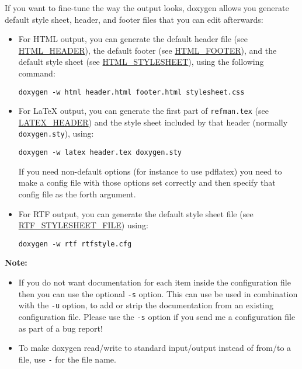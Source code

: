If you want to fine-tune the way the output looks, doxygen allows you generate default style sheet, header, and footer files that you can edit afterwards: \begin{itemize}
\item For HTML output, you can generate the default header file (see \hyperlink{config_cfg_html_header}{HTML\_\-HEADER}), the default footer (see \hyperlink{config_cfg_html_footer}{HTML\_\-FOOTER}), and the default style sheet (see \hyperlink{config_cfg_html_stylesheet}{HTML\_\-STYLESHEET}), using the following command: 

\footnotesize\begin{verbatim}
doxygen -w html header.html footer.html stylesheet.css
\end{verbatim}
\normalsize
 \item For LaTeX output, you can generate the first part of {\tt refman.tex} (see \hyperlink{config_cfg_latex_header}{LATEX\_\-HEADER}) and the style sheet included by that header (normally {\tt doxygen.sty}), using: 

\footnotesize\begin{verbatim}
doxygen -w latex header.tex doxygen.sty
\end{verbatim}
\normalsize
 If you need non-default options (for instance to use pdflatex) you need to make a config file with those options set correctly and then specify that config file as the forth argument. \item For RTF output, you can generate the default style sheet file (see \hyperlink{config_cfg_rtf_stylesheet_file}{RTF\_\-STYLESHEET\_\-FILE}) using: 

\footnotesize\begin{verbatim}
doxygen -w rtf rtfstyle.cfg
\end{verbatim}
\normalsize
 \end{itemize}


{\bf Note:}\par
 \begin{itemize}
\item If you do not want documentation for each item inside the configuration file then you can use the optional {\tt -s} option. This can use be used in combination with the {\tt -u} option, to add or strip the documentation from an existing configuration file. Please use the {\tt -s} option if you send me a configuration file as part of a bug report! \item To make doxygen read/write to standard input/output instead of from/to a file, use {\tt -} for the file name. \end{itemize}
